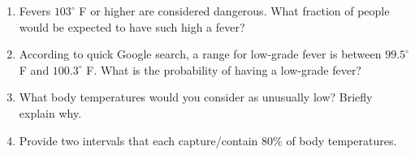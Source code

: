 \documentclass[
  letterpaper,
  DIV=11,
  numbers=noendperiod]{scrartcl}
\begin{document}
\begin{enumerate}
  \begin{enumerate}
  \def\labelenumii{\alph{enumii}.}
  \item
    Fevers \(103^\circ\) F or higher are considered dangerous. What
    fraction of people would be expected to have such high a fever?
  \item
    According to quick Google search, a range for low-grade fever is
    between \(99.5^\circ\) F and \(100.3^\circ\) F. What is the
    probability of having a low-grade fever?
  \item
    What body temperatures would you consider as unusually low? Briefly
    explain why.
  \item
    Provide two intervals that each capture/contain 80\% of body
    temperatures.
  \end{enumerate}
\end{enumerate}
\end{document}
